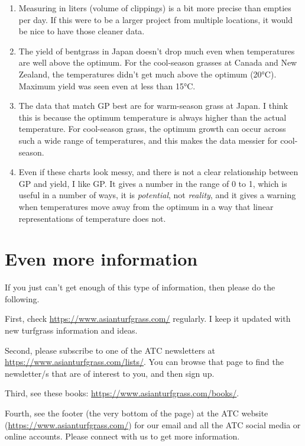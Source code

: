 \documentclass[12pt,b5,]{tufte-book}
\begin{document}
\begin{enumerate}
\def\labelenumi{\arabic{enumi}.}
\item
  Measuring in liters (volume of clippings) is a bit more precise than empties per day. If this were to be a larger project from multiple locations, it would be nice to have those cleaner data.
\item
  The yield of bentgrass in Japan doesn't drop much even when temperatures are well above the optimum. For the cool-season grasses at Canada and New Zealand, the temperatures didn't get much above the optimum (20°C). Maximum yield was seen even at less than 15°C.
\item
  The data that match GP best are for warm-season grass at Japan. I think this is because the optimum temperature is always higher than the actual temperature. For cool-season grass, the optimum growth can occur across such a wide range of temperatures, and this makes the data messier for cool-season.
\item
  Even if these charts look messy, and there is not a clear relationship between GP and yield, I like GP. It gives a number in the range of 0 to 1, which is useful in a number of ways, it is \emph{potential}, not \emph{reality}, and it gives a warning when temperatures move away from the optimum in a way that linear representations of temperature does not.
\end{enumerate}

\hypertarget{even-more-information}{%
\chapter{Even more information}\label{even-more-information}}

If you just can't get enough of this type of information, then please do the following.

First, check \url{https://www.asianturfgrass.com/} regularly. I keep it updated with new turfgrass information and ideas.

Second, please subscribe to one of the ATC newsletters at \url{https://www.asianturfgrass.com/lists/}. You can browse that page to find the newsletter/s that are of interest to you, and then sign up.

Third, see these books: \url{https://www.asianturfgrass.com/books/}.

Fourth, see the footer (the very bottom of the page) at the ATC website (\url{https://www.asianturfgrass.com/}) for our email and all the ATC social media or online accounts. Please connect with us to get more information.


\end{document}
